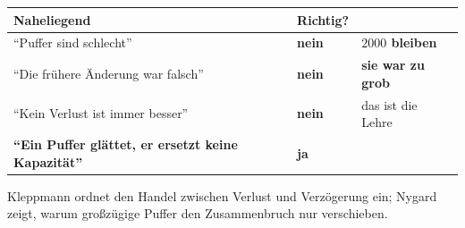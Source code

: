 \begin{warnung}
\begin{center}
\renewcommand{\arraystretch}{1.5}
\begin{tabular}{@{}P{3.2cm}P{2.2cm}P{2.4cm}@{}}
\toprule
\textbf{Naheliegend} & \textbf{Richtig?} & \\
\midrule
\enquote{Puffer sind schlecht} & \textcolor{akzent}{\textbf{nein}} & \textbf{$2000$ bleiben}\\
\enquote{Die frühere Änderung war falsch} & \textcolor{akzent}{\textbf{nein}} & \textcolor{akzent}{\textbf{sie war zu grob}}\\
\enquote{Kein Verlust ist immer besser} & \textcolor{akzent}{\textbf{nein}} & \textcolor{akzent}{das ist die Lehre}\\
\textbf{\enquote{Ein Puffer glättet, er ersetzt keine Kapazität}} & \textcolor{gruen}{\textbf{ja}} & \\
\bottomrule
\end{tabular}
\end{center}

\begin{center}
\begin{minipage}{0.88\textwidth}
\end{minipage}
\end{center}

\begin{center}
\end{center}
\end{warnung}
\vspace{-4pt}
\noindent Klepp\-mann ordnet den Handel zwischen Ver\-lust und Ver\-zö\-ge\-rung ein; Nygard zeigt, warum groß\-zü\-gi\-ge Puffer den Zu\-sam\-men\-bruch nur ver\-schie\-ben.
